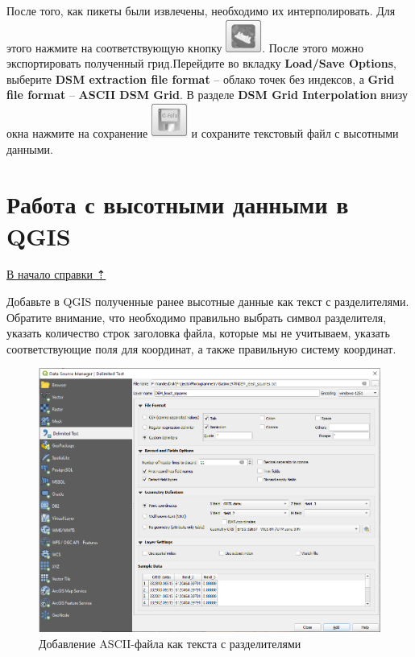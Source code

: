 \documentclass[
  12pt,
]{book}
\begin{document}
После того, как пикеты были извлечены, необходимо их интерполировать. Для этого нажмите на соответствующую кнопку \includegraphics{images/Ref14/DSM_interpolation.png}. После этого можно экспортировать полученный грид.Перейдите во вкладку \textbf{Load/Save Options}, выберите \textbf{DSM extraction file format} -- облако точек без индексов, а \textbf{Grid file format} -- \textbf{ASCII DSM Grid}. В разделе \textbf{DSM Grid Interpolation} внизу окна нажмите на сохранение \includegraphics{images/Ref14/Save_DSM.png} и сохраните текстовый файл с высотными данными.

\hypertarget{dem-QGIS}{%
\section{Работа с высотными данными в QGIS}\label{dem-QGIS}}

\protect\hyperlink{dem}{В начало справки ⇡}

Добавьте в QGIS полученные ранее высотные данные как текст с разделителями. Обратите внимание, что необходимо правильно выбрать символ разделителя, указать количество строк заголовка файла, которые мы не учитываем, указать соответствующие поля для координат, а также правильную систему координат.

\begin{figure}
\centering
\includegraphics{images/Ref14/Delimited_Text.png}
\caption{Добавление ASCII-файла как текста с разделителями}
\end{figure}
\end{document}

